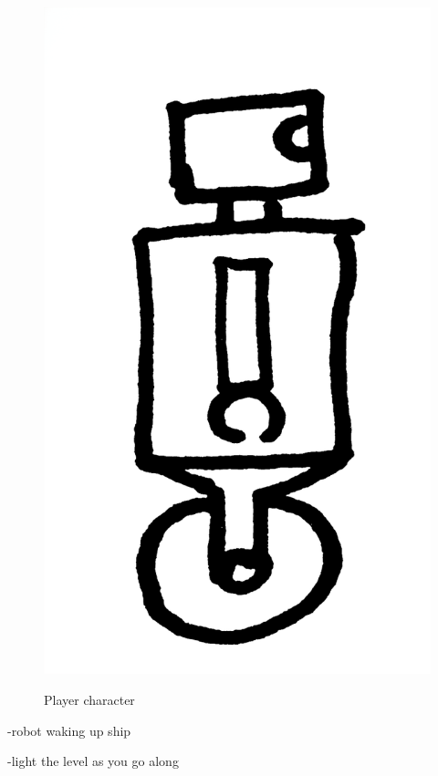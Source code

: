 \begin{figure}
\centering
\includegraphics[scale=0.1, trim = 0cm 0cm 0cm 0cm]{images/robot}
\label{fig:player}
\caption{Player character}
\end{figure}

-robot waking up ship

-light the level as you go along